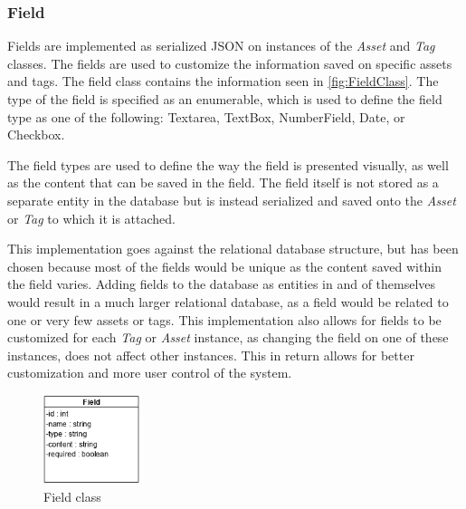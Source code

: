 \subsubsection{Field}
Fields are implemented as serialized JSON on instances of the \textit{Asset} and \textit{Tag} classes. The fields are used to customize the information saved on specific assets and tags. The field class contains the information seen in \autoref{fig:FieldClass}. The type of the field is specified as an enumerable, which is used to define the field type as one of the following: Textarea, TextBox, NumberField, Date, or Checkbox.
\par
The field types are used to define the way the field is presented visually, as well as the content that can be saved in the field. The field itself is not stored as a separate entity in the database but is instead serialized and saved onto the \textit{Asset} or \textit{Tag} to which it is attached.
\par
This implementation goes against the relational database structure, but has been chosen because most of the fields would be unique as the content saved within the field varies. Adding fields to the database as entities in and of themselves would result in a much larger relational database, as a field would be related to one or very few assets or tags. This implementation also allows for fields to be customized for each \textit{Tag} or \textit{Asset} instance, as changing the field on one of these instances, does not affect other instances. This in return allows for better customization and more user control of the system.

\begin{figure}[H]
    \centering
    \includegraphics[width=0.25\textwidth]{figures/Classes/FieldAttributes.png}
    \caption{Field class}
    \label{fig:FieldClass}
\end{figure}